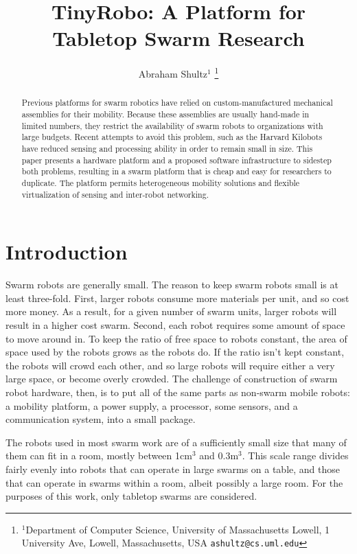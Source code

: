 \documentclass[letterpaper, 10 pt, conference]{ieeeconf}  %
\title{\LARGE \bf
TinyRobo: A Platform for Tabletop Swarm Research
}
\author{Abraham Shultz$^{1}$%
\thanks{$^{1}$Department of Computer Science,
        University of Massachusetts Lowell, 1 University Ave, Lowell, Massachusetts, USA
        {\tt\small ashultz@cs.uml.edu}}%
}
\begin{document}
\maketitle
\thispagestyle{empty}
\pagestyle{empty}


\begin{abstract}

Previous platforms for swarm robotics have relied on custom-manufactured mechanical assemblies for their mobility. Because these assemblies are usually hand-made in limited numbers, they restrict the availability of swarm robots to organizations with large budgets. Recent attempts to avoid this problem, such as the Harvard Kilobots \cite{rubenstein2014kilobot} have reduced sensing and processing ability in order to remain small in size. This paper presents a hardware platform and a proposed software infrastructure to sidestep both problems, resulting in a swarm platform that is cheap and easy for researchers to duplicate. The platform permits heterogeneous mobility solutions and flexible virtualization of sensing and inter-robot networking.   

\end{abstract}


\section{Introduction}

Swarm robots are generally small. 
The reason to keep swarm robots small is at least three-fold. 
First, larger robots consume more materials per unit, and so cost more money.
As a result, for a given number of swarm units, larger robots will result in a higher cost swarm. 
Second, each robot requires some amount of space to move around in. 
To keep the ratio of free space to robots constant, the area of space used by the robots grows as the robots do. 
If the ratio isn't kept constant, the robots will crowd each other, and so large robots will require either a very large space, or become overly crowded. 
The challenge of construction of swarm robot hardware, then, is to put all of the same parts as non-swarm mobile robots: a mobility platform, a power supply, a processor, some sensors, and a communication system, into a small package.

The robots used in most swarm work are of a sufficiently small size that many of them can fit in a room, mostly between 1cm$^3$ and 0.3m$^3$. 
This scale range divides fairly evenly into robots that can operate in large swarms on a table, and those that can operate in swarms within a room, albeit possibly a large room. 
For the purposes of this work, only tabletop swarms are considered. 
\end{document}
